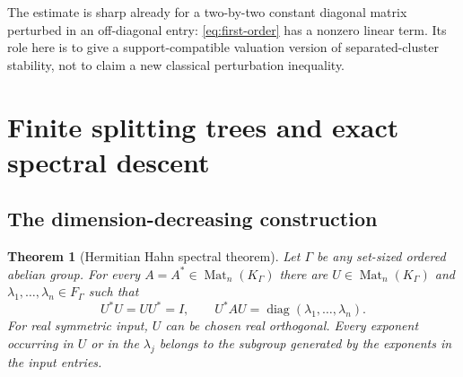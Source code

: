 \documentclass[11pt,letterpaper]{article}
\numberwithin{equation}{section}
\newtheorem{theorem}{Theorem}[section]
\theoremstyle{definition}
\theoremstyle{remark}
\newcommand{\Mat}{\operatorname{Mat}}
\newcommand{\diag}{\operatorname{diag}}
\newcommand{\KG}{K_{\Gamma}}
\newcommand{\FG}{F_{\Gamma}}
\begin{document}
The estimate is sharp already for a two-by-two constant diagonal matrix
perturbed in an off-diagonal entry: \cref{eq:first-order} has a nonzero
linear term. Its role here is to give a support-compatible valuation version
of separated-cluster stability, not to claim a new classical perturbation
inequality.

\section{Finite splitting trees and exact spectral descent}
\label{sec:spectral}

\subsection{The dimension-decreasing construction}

\begin{theorem}[Hermitian Hahn spectral theorem]\label{thm:hermitian}
Let $\Gamma$ be any set-sized ordered abelian group. For every
$A=A^*\in\Mat_n(\KG)$ there are $U\in\Mat_n(\KG)$ and
$\lambda_1,\ldots,\lambda_n\in\FG$ such that
\[
 U^*U=UU^*=I,\qquad U^*AU=\diag(\lambda_1,\ldots,\lambda_n).
\]
For real symmetric input, $U$ can be chosen real orthogonal. Every exponent
occurring in $U$ or in the $\lambda_j$ belongs to the subgroup generated by
the exponents in the input entries.
\end{theorem}
\end{document}
